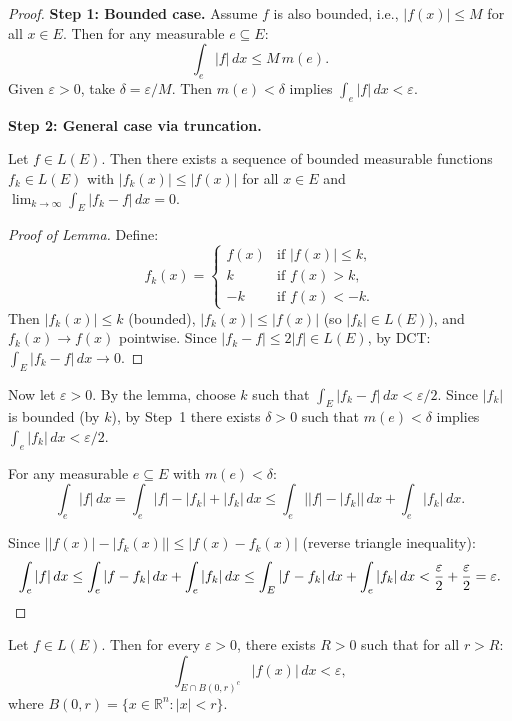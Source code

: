 \documentclass[11pt]{report}
\begin{document}
\begin{proof}
\textbf{Step 1: Bounded case.} Assume $f$ is also bounded, i.e., $|f(x)| \leq M$ for all $x \in E$. Then for any measurable $e \subseteq E$:
\[
\int_e |f|\,dx \leq M\,m(e).
\]
Given $\varepsilon > 0$, take $\delta = \varepsilon/M$. Then $m(e) < \delta$ implies $\int_e |f|\,dx < \varepsilon$.

\textbf{Step 2: General case via truncation.}

\begin{lembox}
Let $f \in L(E)$. Then there exists a sequence of bounded measurable functions $f_k \in L(E)$ with $|f_k(x)| \leq |f(x)|$ for all $x \in E$ and $\lim_{k \to \infty} \int_E |f_k - f|\,dx = 0$.
\end{lembox}

\begin{proof}[Proof of Lemma]
Define:
\[
f_k(x) = \begin{cases} f(x) & \text{if } |f(x)| \leq k, \\ k & \text{if } f(x) > k, \\ -k & \text{if } f(x) < -k. \end{cases}
\]
Then $|f_k(x)| \leq k$ (bounded), $|f_k(x)| \leq |f(x)|$ (so $|f_k| \in L(E)$), and $f_k(x) \to f(x)$ pointwise. Since $|f_k - f| \leq 2|f| \in L(E)$, by DCT: $\int_E |f_k - f|\,dx \to 0$.
\end{proof}

Now let $\varepsilon > 0$. By the lemma, choose $k$ such that $\int_E |f_k - f|\,dx < \varepsilon/2$. Since $|f_k|$ is bounded (by $k$), by Step~1 there exists $\delta > 0$ such that $m(e) < \delta$ implies $\int_e |f_k|\,dx < \varepsilon/2$.

For any measurable $e \subseteq E$ with $m(e) < \delta$:
\[
\int_e |f|\,dx = \int_e |f| - |f_k| + |f_k|\,dx \leq \int_e \bigl||f| - |f_k|\bigr|\,dx + \int_e |f_k|\,dx.
\]

Since $\bigl||f(x)| - |f_k(x)|\bigr| \leq |f(x) - f_k(x)|$ (reverse triangle inequality):
\[
\int_e |f|\,dx \leq \int_e |f - f_k|\,dx + \int_e |f_k|\,dx \leq \int_E |f - f_k|\,dx + \int_e |f_k|\,dx < \frac{\varepsilon}{2} + \frac{\varepsilon}{2} = \varepsilon. \qedhere
\]
\end{proof}

\begin{thmbox}
Let $f \in L(E)$. Then for every $\varepsilon > 0$, there exists $R > 0$ such that for all $r > R$:
\[
\int_{E \cap B(0,r)^c} |f(x)|\,dx < \varepsilon,
\]
where $B(0, r) = \{x \in \mathbb{R}^n : |x| < r\}$.
\end{thmbox}
\end{document}

